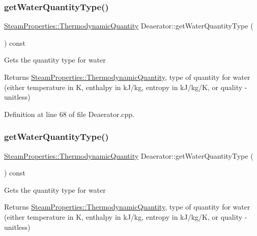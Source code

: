 \subsubsection{\texorpdfstring{get\+Water\+Quantity\+Type()}{getWaterQuantityType()}\hspace{0.1cm}{\footnotesize\ttfamily [2/3]}}
{\footnotesize\ttfamily \hyperlink{class_steam_properties_ae0294bedf7d178c2d8fb6aed0f62fbff}{Steam\+Properties\+::\+Thermodynamic\+Quantity} Deaerator\+::get\+Water\+Quantity\+Type (\begin{DoxyParamCaption}{ }\end{DoxyParamCaption}) const}

Gets the quantity type for water \begin{DoxyReturn}{Returns}
\hyperlink{class_steam_properties_ae0294bedf7d178c2d8fb6aed0f62fbff}{Steam\+Properties\+::\+Thermodynamic\+Quantity}, type of quantity for water (either temperature in K, enthalpy in k\+J/kg, entropy in k\+J/kg/K, or quality -\/ unitless) 
\end{DoxyReturn}


Definition at line 68 of file Deaerator.\+cpp.

\mbox{\label{class_deaerator_a414282f81906e09a28bc75cf51659ec2}} 
\subsubsection{\texorpdfstring{get\+Water\+Quantity\+Type()}{getWaterQuantityType()}\hspace{0.1cm}{\footnotesize\ttfamily [3/3]}}
{\footnotesize\ttfamily \hyperlink{class_steam_properties_ae0294bedf7d178c2d8fb6aed0f62fbff}{Steam\+Properties\+::\+Thermodynamic\+Quantity} Deaerator\+::get\+Water\+Quantity\+Type (\begin{DoxyParamCaption}{ }\end{DoxyParamCaption}) const}

Gets the quantity type for water \begin{DoxyReturn}{Returns}
\hyperlink{class_steam_properties_ae0294bedf7d178c2d8fb6aed0f62fbff}{Steam\+Properties\+::\+Thermodynamic\+Quantity}, type of quantity for water (either temperature in K, enthalpy in k\+J/kg, entropy in k\+J/kg/K, or quality -\/ unitless) 
\end{DoxyReturn}
\mbox{\label{class_deaerator_a9362430fb04802b6f14c9bf09d62a466}} 
